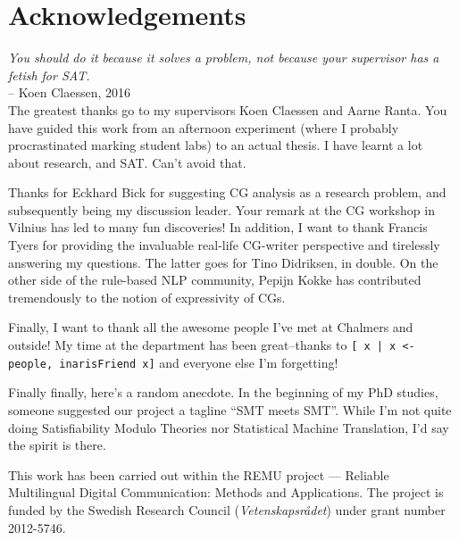 \chapter*{Acknowledgements}\label{chp:acknowledgements}


\emph{You should do it because it solves a problem, not because your supervisor has a fetish for SAT.} \\
-- Koen Claessen, 2016 \\

The greatest thanks go to my supervisors Koen Claessen and Aarne Ranta. 
You have guided this work from an afternoon experiment (where I probably procrastinated marking student labs) to an actual thesis. I have learnt a lot about research,  and SAT. Can't avoid that.


Thanks for Eckhard Bick for suggesting CG analysis as a research
problem, and subsequently being my discussion leader. 
Your remark at the CG workshop in Vilnius has led to many fun discoveries!
In addition, I want to thank Francis Tyers for providing the invaluable real-life CG-writer perspective and tirelessly answering my questions. The latter goes for Tino Didriksen, in double. On the other side of the rule-based NLP community, Pepijn Kokke 
has contributed tremendously to the notion of expressivity of CGs.

Finally, I want to thank all the awesome people I've met at Chalmers and outside! 
My time at the department has been great--thanks to 
\texttt{[ x | x <- people, inarisFriend x]} 
and everyone else I'm forgetting! 









Finally finally, here's a random anecdote. 
In the beginning of my PhD studies, someone suggested our project 
a tagline ``SMT meets SMT''. While I'm not quite doing Satisfiability
Modulo Theories nor Statistical Machine Translation, I'd say the spirit is there.






\vfill\noindent
This work has been carried out within the REMU project — Reliable Multilingual Digital Communication: Methods and Applications.
The project is funded by the Swedish Research Council (\emph{Vetenskapsrådet}) under grant number 2012-5746.
